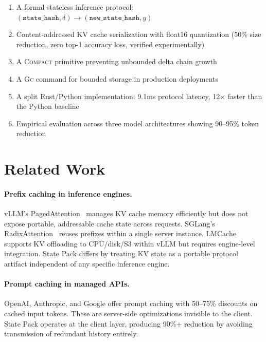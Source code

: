 \documentclass[11pt,a4paper]{article}
\begin{document}
\begin{enumerate}
  \item A formal stateless inference protocol:
        $(\texttt{state\_hash}, \delta) \rightarrow (\texttt{new\_state\_hash}, y)$
  \item Content-addressed KV cache serialization with float16 quantization
        (50\% size reduction, zero top-1 accuracy loss, verified experimentally)
  \item A \textsc{Compact} primitive preventing unbounded delta chain growth
  \item A \textsc{Gc} command for bounded storage in production deployments
  \item A split Rust/Python implementation: 9.1ms protocol latency, 12$\times$
        faster than the Python baseline
  \item Empirical evaluation across three model architectures showing 90--95\%
        token reduction
\end{enumerate}

\section{Related Work}
\label{sec:related}

\paragraph{Prefix caching in inference engines.}
vLLM's PagedAttention~\cite{kwon2023} manages KV cache memory efficiently
but does not expose portable, addressable cache state across requests.
SGLang's RadixAttention~\cite{zheng2023} reuses prefixes within a single
server instance. LMCache~\cite{lmcache2024} supports KV offloading to
CPU/disk/S3 within vLLM but requires engine-level integration. State Pack
differs by treating KV state as a portable protocol artifact independent of
any specific inference engine.

\paragraph{Prompt caching in managed APIs.}
OpenAI, Anthropic, and Google offer prompt caching with 50--75\% discounts
on cached input tokens. These are server-side optimizations invisible to the
client. State Pack operates at the client layer, producing 90\%+ reduction
by avoiding transmission of redundant history entirely.
\end{document}
